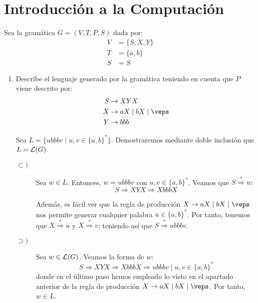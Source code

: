 \section{Introducción a la Computación}


\begin{ejercicio}
    Sea la gramática $G=\left(V,T,P,S\right)$ dada por:
    \begin{align*}
        V &= \{S, X, Y\} \\
        T &= \{a,b\} \\
        S &= S
    \end{align*}
    \begin{enumerate}
        \item Describe el lenguaje generado por la gramática teniendo en cuenta que $P$ viene descrito por:
        \begin{align*}
            S &\rightarrow XYX \\
            X &\rightarrow aX \mid bX \mid \veps \\
            Y &\rightarrow bbb
        \end{align*}

        Sea $L=\{ubbbv\mid u,v\in\{a,b\}^\ast\}$. Demostraremos mediante doble inclusión que $L=\mathcal{L}(G)$.
        \begin{description}
            \item[$\subset)$] Sea $w\in L$. Entonces, $w=ubbbv$ con $u,v\in\{a,b\}^\ast$. Veamos que
            $S \stackrel{\ast}{\Longrightarrow} w$:
            \begin{equation*}
                S \Longrightarrow XYX \Longrightarrow XbbbX
            \end{equation*}

            Además, es fácil ver que la regla de producción $X\rightarrow aX \mid bX \mid \veps$ nos permite generar cualquier palabra $u\in\{a,b\}^\ast$. Por tanto, tenemos que $X \stackrel{\ast}{\Longrightarrow} u$ y $X \stackrel{\ast}{\Longrightarrow} v$; teniendo así que $S \stackrel{\ast}{\Longrightarrow} ubbbv$.

            \item[$\supset)$] Sea $w\in\mathcal{L}(G)$. Veamos la forma de $w$:
            \begin{equation*}
                S \Longrightarrow XYX \Longrightarrow XbbbX \Longrightarrow ubbbv \mid u,v\in\{a,b\}^\ast
            \end{equation*}
            donde en el último paso hemos empleado lo visto en el apartado anterior de la regla de producción $X\rightarrow aX \mid bX \mid \veps$. Por tanto, $w\in L$.
        \end{description}



\end{enumerate}
\end{ejercicio}
